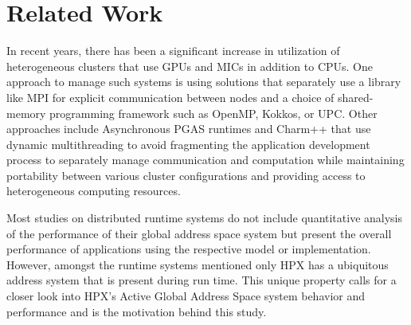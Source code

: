 \section{Related Work}
\label{related_work}


In recent years, there has been a significant increase in utilization of
heterogeneous clusters that use GPUs and MICs in addition to
CPUs\cite{Lena2014,Yang2011266,Potluri2014,Sidelnik2011}. One approach to
manage such systems is using
solutions\cite{Rabenseifner2009,Yang2011266,Chorley2010} that separately use a
library like MPI for explicit communication between nodes and a choice of
shared-memory programming framework such as OpenMP\cite{openmp_org}, Kokkos\cite{kokkos_paper,kokkos_repo}, or
UPC\cite{upc_org}. Other approaches include Asynchronous PGAS
runtimes\cite{Saraswat2010} and Charm++\cite{charm_edu} that use dynamic
multithreading to avoid fragmenting the application development process to
separately manage communication and computation while maintaining portability
between various cluster configurations and providing access to heterogeneous
computing resources\cite{P0234R0}.

Most studies on distributed runtime systems do not include quantitative
analysis of the performance of their global address space system but present
the overall performance of applications using the respective model or
implementation. However, amongst the runtime systems mentioned only HPX has a
ubiquitous address system that is present during run time. This unique property
calls for a closer look into HPX's Active Global Address Space system behavior
and performance and is the motivation behind this study.

